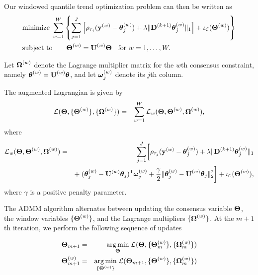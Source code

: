 \documentclass[12pt]{article}
\newcommand{\Tra}{^{\sf T}} %
\newcommand{\V}[1]{{\bm{\mathbf{\MakeLowercase{#1}}}}} %
\newcommand{\Vn}[2]{\V{#1}^{(#2)}} %
\newcommand{\M}[1]{{\bm{\mathbf{\MakeUppercase{#1}}}}} %
\newcommand{\Mn}[2]{\M{#1}^{(#2)}} %
\begin{document}
	Our windowed quantile trend optimization problem can then be written as 
	 \begin{equation}
		 \label{eq:quantile_windows}
		 \begin{split}
		 &\text{minimize}\; \sum_{w=1}^W \left \{\sum_{j=1}^J \left [\rho_{\tau_j}(\Vn{y}{w} - \Vn{\theta}{w}_{j}) + 
		 \lambda \lVert \Mn{D}{k+1} \Vn{\theta}{w}_{j} \rVert_1 \right ] + \iota_\mathcal{C}(\Mn{\Theta}{w}) \right\}\\
		 &\text{subject to} \qquad \Mn{\Theta}{w} = \Mn{U}{w}\M{\Theta} \;\; \text{ for } w = 1, \ldots, W.
		 \end{split}
	 \end{equation}	 
	 
	 	 Let $\Mn{\Omega}{w}$ denote the Lagrange multiplier matrix for the $w$th consensus constraint, namely $\Mn{\theta}{w} = \Mn{U}{w}\M{\theta}$, and let $\Vn{\omega}{w}_{j}$ denote its $j$th column.
%		 
		  
		  The augmented Lagrangian is given by
	 \begin{eqnarray*}
	 \mathcal{L}(\M{\Theta}, \{\Mn{\Theta}{w}\}, \{\Mn{\Omega}{w}\}) & = & \sum_{w=1}^W \mathcal{L}_w(\M{\Theta}, \Mn{\Theta}{w}, \Mn{\Omega}{w}),
\end{eqnarray*}
where
\begin{eqnarray*}
 \mathcal{L}_w(\M{\Theta}, \Mn{\Theta}{w}, \Mn{\Omega}{w}) & = & \sum_{j=1}^J \biggl [\rho_{\tau_j}(\Vn{y}{w} - \Vn{\theta}{w}_j)+\lambda \lVert \Mn{D}{k+1}\Vn{\theta}{w}_j\rVert_1 \\
	 && + \; (\Vn{\theta}{w}_j - \Mn{U}{w}\V{\theta}_{j})\Tra\Vn{\omega}{w}_{j} + 
	 \frac{\gamma}{2}\lVert \Vn{\theta}{w}_j - \Mn{U}{w}\V{\theta}_{j}\rVert_2^2 \biggr ] + \iota_\mathcal{C}(\Mn{\Theta}{w}),
	 \end{eqnarray*}
	 where $\gamma$ is a positive penalty parameter. 

The ADMM algorithm alternates between updating the consensus variable $\M{\Theta}$, the window variables $\{\Mn{\Theta}{w}\}$, and the Lagrange multipliers $\{\Mn{\Omega}{w}\}$. 
At the $m+1$th iteration, we perform the following sequence of updates	 

\begin{eqnarray*}
	\M{\Theta}_{m+1} & = & \underset{\M{\Theta}}{\arg\min}\; \mathcal{L}(\M{\Theta}, \{\Mn{\Theta}{w}_m\}, \{\Mn{\Omega}{w}_m\}) \\
	\Mn{\Theta}{w}_{m+1} & = & \underset{\{\Mn{\Theta}{w}\}}{\arg\min}\; \mathcal{L}(\M{\Theta}_{m+1}, \{\Mn{\Theta}{w}\}, \{\Mn{\Omega}{w}_m\}) \\
\end{eqnarray*}
\end{document}
